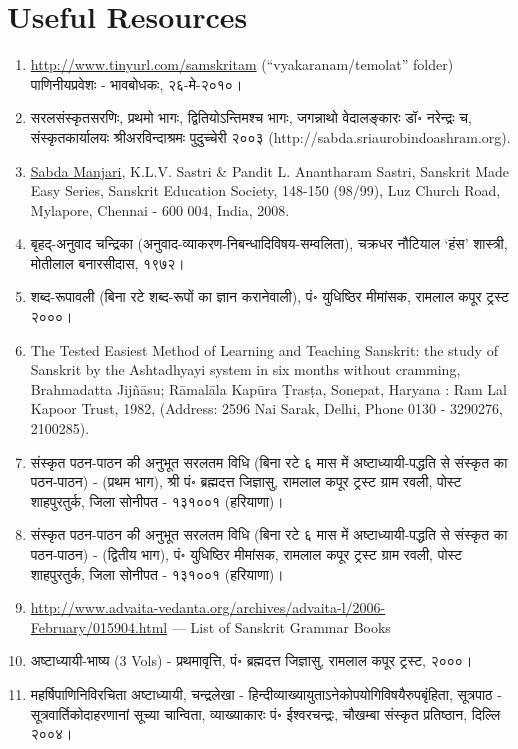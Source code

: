 \documentclass[leqno,fleqn,12pt]{article}%
\newenvironment{ewosp}{\begin{enumerate} \setlength{\itemsep}{0mm}
    \setlength{\parskip}{0mm}}{\end{enumerate}}
\begin{document}
\section{Useful Resources}
\begin{ewosp}
\item \url{http://www.tinyurl.com/samskritam} (``vyakaranam/temolat'' folder) पाणिनीयप्रवेशः - भावबोधकः, २६-मे-२०१०।
\item सरलसंस्कृतसरणिः, प्रथमो भागः, द्वितियोऽन्तिमश्च भागः, जगन्नाथो वेदालङ्कारः डॉ॰ नरेन्द्रः च, संस्कृतकार्यालयः श्रीअरविन्दाश्रमः पुदुच्चेरी २००३ (http://sabda.sriaurobindoashram.org).
\item \href{http://www.sanskritebooks.org/2009/06/sabda-manjari/}{Sabda Manjari}, K.L.V. Sastri \& Pandit L. Anantharam Sastri, Sanskrit Made Easy Series, Sanskrit Education Society, 148-150 (98/99), Luz Church Road, Mylapore, Chennai - 600 004, India, 2008.
\item बृहद्-अनुवाद चन्द्रिका (अनुवाद-व्याकरण-निबन्धादिविषय-सम्वलिता), चक्रधर नौटियाल `हंस' शास्त्री, मोतीलाल बनारसीदास, १९७२।
\item शब्द-रूपावली (बिना रटे शब्द-रूपों का ज्ञान करानेवाली), पं॰ युधिष्ठिर मीमांसक, रामलाल कपूर ट्रस्ट २०००।
\item The Tested Easiest Method of Learning and Teaching Sanskrit: the study of Sanskrit by the Ashtadhyayi system in six months without cramming, Brahmadatta Jijñāsu; Rāmalāla Kapūra Ṭrasṭa, Sonepat, Haryana : Ram Lal Kapoor Trust, 1982, (Address: 2596 Nai Sarak, Delhi, Phone 0130 - 3290276, 2100285).
\item संस्कृत पठन-पाठन की अनुभूत सरलतम विधि (बिना रटे ६ मास में अष्टाध्यायी-पद्धति से संस्कृत का पठन-पाठन) - (प्रथम भाग), श्री पं॰ ब्रह्मदत्त जिज्ञासु, रामलाल कपूर ट्रस्ट ग्राम रवली, पोस्ट शाहपुरतुर्क, जिला सोनीपत - १३१००१ (हरियाणा)।
\item संस्कृत पठन-पाठन की अनुभूत सरलतम विधि (बिना रटे ६ मास में अष्टाध्यायी-पद्धति से संस्कृत का पठन-पाठन) - (द्वितीय भाग), पं॰ युधिष्ठिर मीमांसक, रामलाल कपूर ट्रस्ट ग्राम रवली, पोस्ट शाहपुरतुर्क, जिला सोनीपत - १३१००१ (हरियाणा)।
\item \url{http://www.advaita-vedanta.org/archives/advaita-l/2006-February/015904.html} --- List of Sanskrit Grammar Books
\item अष्टाध्यायी-भाष्य (3 Vols) - प्रथमावृत्ति, पं॰ ब्रह्मदत्त जिज्ञासु, रामलाल कपूर ट्रस्ट, २०००।
\item महर्षिपाणिनिविरचिता अष्टाध्यायी, चन्द्रलेखा - हिन्दीव्याख्यायुताऽनेकोपयोगिविषयैरुपबृंहिता, सूत्रपाठ - सूत्रवार्तिकोदाहरणानां सूच्या चान्विता, व्याख्याकारः पं॰ ईश्वरचन्द्रः, चौखम्बा संस्कृत प्रतिष्ठान, दिल्लि २००४।

\end{ewosp}
\end{document}
